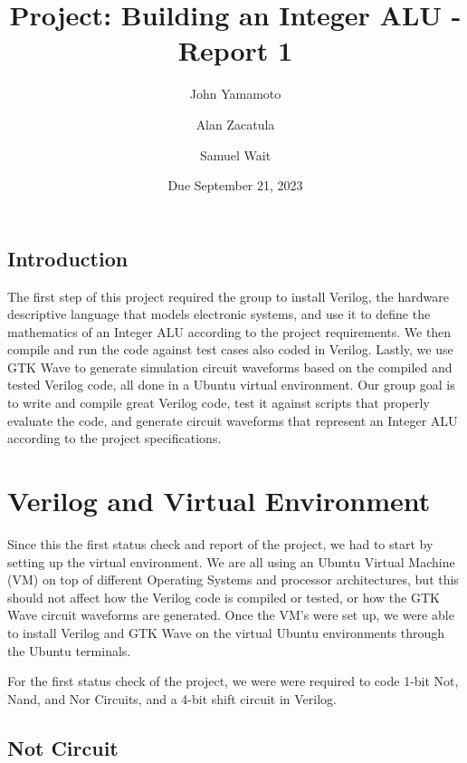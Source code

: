 \documentclass[runningheads, 12pt]{report}
\begin{document}
	
	\title{Project: Building an Integer ALU - Report 1}
	\author{John Yamamoto 
		\and Alan Zacatula
		\and  Samuel Wait}
	\date{Due September 21, 2023}

	\maketitle
	
	\section{Introduction}
	
	The first step of this project required the group to install Verilog, the hardware descriptive language that models electronic systems, and use it to define the mathematics of an Integer ALU according to the project requirements. We then compile and run the code against test cases also coded in Verilog. Lastly, we use GTK Wave to generate simulation circuit waveforms based on the compiled and tested Verilog code, all done in a Ubuntu virtual environment. Our group goal is to write and compile great Verilog code, test it against scripts that properly evaluate the code, and generate circuit waveforms that represent an Integer ALU according to the project specifications. 
	
	\chapter{Verilog and Virtual Environment}
	
Since this the first status check and report of the project, we had to start by setting up the virtual environment. We are all using an Ubuntu Virtual Machine (VM)  on top of different Operating Systems and processor architectures, but this should not affect how the Verilog code is compiled or tested, or how the GTK Wave circuit waveforms are generated. Once the VM's were set up, we were able to install Verilog and GTK Wave on the virtual Ubuntu environments through the Ubuntu terminals.
	
For the first status check of the project, we were were required to code 1-bit Not, Nand, and Nor Circuits, and a 4-bit shift circuit in Verilog. 
\pagebreak

		\section{Not Circuit}
	
\end{document}

